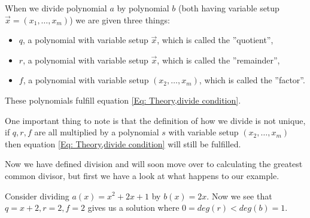\begin{definition}
  When we divide polynomial $a$ by polynomial $b$ (both having variable setup $\vec{x}=(x_1,\ldots,x_m)$) we are given three things:
  \begin{itemize}
    \item $q$, a polynomial with variable setup $\vec{x}$, which is called the ''quotient'',
    \item $r$, a polynomial with variable setup $\vec{x}$, which is called the ''remainder'',
    \item $f$, a polynomial with variable setup $(x_2,\ldots,x_m)$, which is called the ''factor''.
  \end{itemize}
  These polynomials fulfill equation \eqref{Eq: Theory,divide condition}.
\end{definition}
\begin{remark}
  One important thing to note is that the definition of how we divide is not unique, if $q,r,f$ are all multiplied by a polynomial $s$ with variable setup $(x_2,\ldots,x_m)$ then equation \eqref{Eq: Theory,divide condition} will still be fulfilled.
\end{remark}

Now we have defined division and will soon move over to calculating the greatest common divisor, but first we have a look at what happens to our example.
\begin{example}
  Consider dividing $a(x)=x^2+2x+1$ by $b(x)=2x$. Now we see that $q=x+2,r=2,f=2$ gives us a solution where $0=deg(r)<deg(b)=1$.
\end{example}

